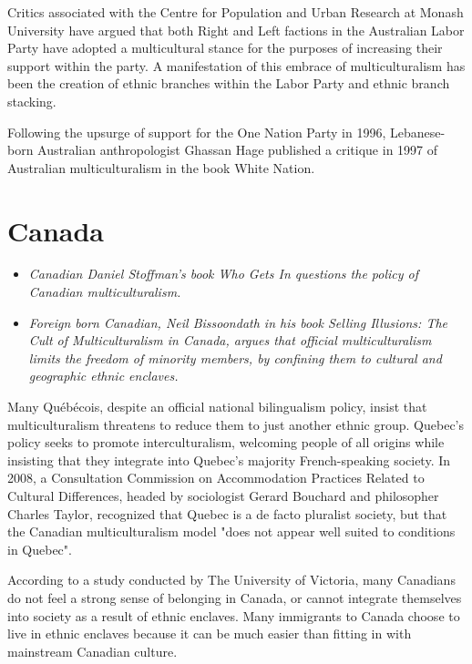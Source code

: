 Critics associated with the Centre for Population and Urban Research at
Monash University have argued that both Right and Left factions in the
Australian Labor Party have adopted a multicultural stance for the
purposes of increasing their support within the party. A manifestation
of this embrace of multiculturalism has been the creation of ethnic
branches within the Labor Party and ethnic branch stacking.

Following the upsurge of support for the One Nation Party in 1996,
Lebanese-born Australian anthropologist Ghassan Hage published a
critique in 1997 of Australian multiculturalism in the book White
Nation.

\section{Canada}\label{canada}

\begin{itemize}
\item
  \emph{Canadian Daniel Stoffman's book Who Gets In questions the policy
  of Canadian multiculturalism.}
\item
  \emph{Foreign born Canadian, Neil Bissoondath in his book Selling
  Illusions: The Cult of Multiculturalism in Canada, argues that
  official multiculturalism limits the freedom of minority members, by
  confining them to cultural and geographic ethnic enclaves.}
\end{itemize}

Many Québécois, despite an official national bilingualism policy, insist
that multiculturalism threatens to reduce them to just another ethnic
group. Quebec's policy seeks to promote interculturalism, welcoming
people of all origins while insisting that they integrate into Quebec's
majority French-speaking society. In 2008, a Consultation Commission on
Accommodation Practices Related to Cultural Differences, headed by
sociologist Gerard Bouchard and philosopher Charles Taylor, recognized
that Quebec is a de facto pluralist society, but that the Canadian
multiculturalism model "does not appear well suited to conditions in
Quebec".

According to a study conducted by The University of Victoria, many
Canadians do not feel a strong sense of belonging in Canada, or cannot
integrate themselves into society as a result of ethnic enclaves. Many
immigrants to Canada choose to live in ethnic enclaves because it can be
much easier than fitting in with mainstream Canadian culture.

